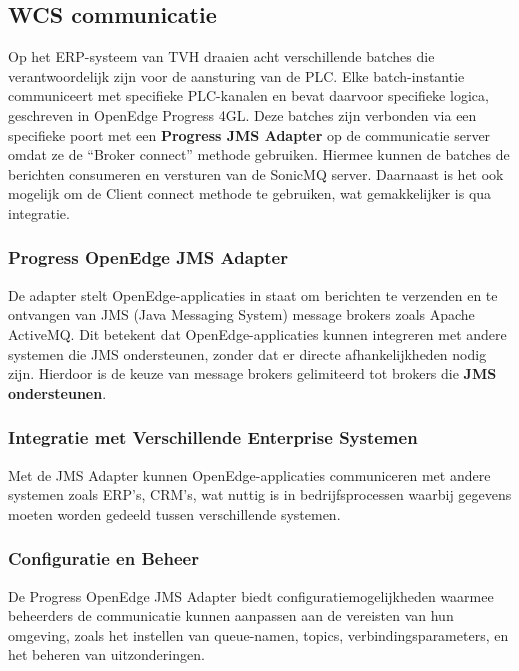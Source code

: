 \subsection{WCS communicatie} 
Op het ERP-systeem van TVH draaien acht verschillende batches die verantwoordelijk zijn voor de aansturing van de PLC. 
Elke batch-instantie communiceert met specifieke PLC-kanalen en bevat daarvoor specifieke logica, geschreven in OpenEdge Progress 4GL.
Deze batches zijn verbonden via een specifieke poort met een \textbf{Progress JMS Adapter} op de communicatie server omdat ze de ``Broker connect'' methode gebruiken.
Hiermee kunnen de batches de berichten consumeren en versturen van de SonicMQ server.
Daarnaast is het ook mogelijk om de Client connect methode te gebruiken, wat gemakkelijker is qua integratie.

\subsubsection{Progress OpenEdge JMS Adapter}
De adapter stelt OpenEdge-applicaties in staat om berichten te verzenden en te ontvangen van JMS (Java Messaging System)
message brokers zoals Apache ActiveMQ. 
Dit betekent dat OpenEdge-applicaties kunnen integreren met andere systemen die JMS ondersteunen, 
zonder dat er directe afhankelijkheden nodig zijn.
Hierdoor is de keuze van message brokers gelimiteerd tot brokers die \textbf{JMS ondersteunen}.

\subsubsection{Integratie met Verschillende Enterprise Systemen}
Met de JMS Adapter kunnen OpenEdge-applicaties communiceren met andere systemen zoals ERP's, CRM’s, 
wat nuttig is in bedrijfsprocessen waarbij gegevens moeten worden gedeeld tussen verschillende systemen.

\subsubsection{Configuratie en Beheer}
De Progress OpenEdge JMS Adapter biedt configuratiemogelijkheden waarmee beheerders de communicatie kunnen aanpassen 
aan de vereisten van hun omgeving, zoals het instellen van queue-namen, topics, verbindingsparameters, en het beheren van uitzonderingen.

